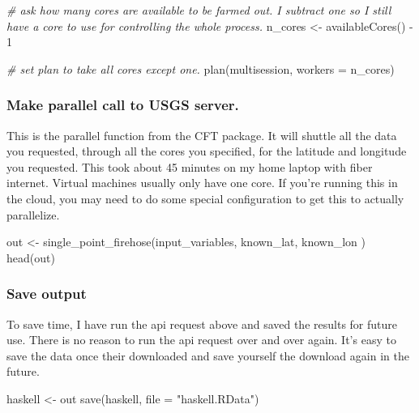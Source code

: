 \documentclass[
  paper=a4,
  ,captions=tableheading
]{scrartcl}
\newenvironment{Shaded}{\begin{snugshade}}{\end{snugshade}}
\newcommand{\AttributeTok}[1]{\textcolor[rgb]{0.77,0.63,0.00}{#1}}
\newcommand{\CommentTok}[1]{\textcolor[rgb]{0.56,0.35,0.01}{\textit{#1}}}
\newcommand{\DecValTok}[1]{\textcolor[rgb]{0.00,0.00,0.81}{#1}}
\newcommand{\FunctionTok}[1]{\textcolor[rgb]{0.00,0.00,0.00}{#1}}
\newcommand{\NormalTok}[1]{#1}
\newcommand{\OtherTok}[1]{\textcolor[rgb]{0.56,0.35,0.01}{#1}}
\newcommand{\SpecialCharTok}[1]{\textcolor[rgb]{0.00,0.00,0.00}{#1}}
\newcommand{\StringTok}[1]{\textcolor[rgb]{0.31,0.60,0.02}{#1}}
\begin{document}
\begin{Shaded}
\begin{Highlighting}[]
\CommentTok{\# ask how many cores are available to be farmed out. I subtract one so I still have a core to use for controlling the whole process. }
\NormalTok{n\_cores }\OtherTok{\textless{}{-}} \FunctionTok{availableCores}\NormalTok{() }\SpecialCharTok{{-}} \DecValTok{1}

\CommentTok{\# set plan to take all cores except one. }
\FunctionTok{plan}\NormalTok{(multisession, }\AttributeTok{workers =}\NormalTok{ n\_cores)}
\end{Highlighting}
\end{Shaded}

\hypertarget{make-parallel-call-to-usgs-server.}{%
\subsubsection{Make parallel call to USGS
server.}\label{make-parallel-call-to-usgs-server.}}

This is the parallel function from the CFT package. It will shuttle all
the data you requested, through all the cores you specified, for the
latitude and longitude you requested. This took about 45 minutes on my
home laptop with fiber internet. Virtual machines usually only have one
core. If you're running this in the cloud, you may need to do some
special configuration to get this to actually parallelize.

\begin{Shaded}
\begin{Highlighting}[]
\NormalTok{out }\OtherTok{\textless{}{-}} \FunctionTok{single\_point\_firehose}\NormalTok{(input\_variables, known\_lat, known\_lon )}
\FunctionTok{head}\NormalTok{(out)}
\end{Highlighting}
\end{Shaded}

\hypertarget{save-output}{%
\subsubsection{Save output}\label{save-output}}

To save time, I have run the api request above and saved the results for
future use. There is no reason to run the api request over and over
again. It's easy to save the data once their downloaded and save
yourself the download again in the future.

\begin{Shaded}
\begin{Highlighting}[]
\NormalTok{haskell }\OtherTok{\textless{}{-}}\NormalTok{ out}
\FunctionTok{save}\NormalTok{(haskell, }\AttributeTok{file =} \StringTok{"haskell.RData"}\NormalTok{)}
\end{Highlighting}
\end{Shaded}
\end{document}
